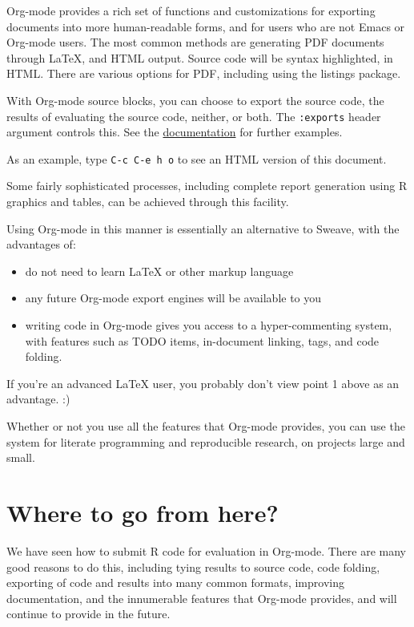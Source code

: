 \documentclass[11pt]{article}
\begin{document}
Org-mode provides a rich set of functions and customizations for exporting documents into more human-readable forms, and for users who are not Emacs or Org-mode users. The most common methods are generating PDF documents through \LaTeX{}, and HTML output. Source code will be syntax highlighted, in HTML.  There are various options for PDF, including using the listings package.

With Org-mode source blocks, you can choose to export the source code, the results of evaluating the source code, neither, or both. The \texttt{:exports} header argument controls this. See the \href{http://orgmode.org/manual/Exporting-code-blocks.html#Exporting-code-blocks}{documentation} for further examples. 

As an example, type \texttt{C-c C-e h o} to see an HTML version of this document.

Some fairly sophisticated processes, including complete report generation using R graphics and tables, can be achieved through this facility.

Using Org-mode in this manner is essentially an alternative to Sweave, with the advantages of:
\begin{itemize}
\item do not need to learn \LaTeX{} or other markup language
\item any future Org-mode export engines will be available to you
\item writing code in Org-mode gives you access to a hyper-commenting system, with features such as TODO items, in-document linking, tags, and code folding.
\end{itemize}

If you're an advanced \LaTeX{} user, you probably don't view point 1 above as an advantage. :) 

Whether or not you use all the features that Org-mode provides, you can use the system for literate programming and reproducible research, on projects large and small.
\section*{Where to go from here?}
\label{sec-10}

We have seen how to submit R code for evaluation in Org-mode. There are many good reasons to do this, including tying results to source code, code folding, exporting of code and results into many common formats, improving documentation, and the innumerable features that Org-mode provides, and will continue to provide in the future. 
\end{document}
